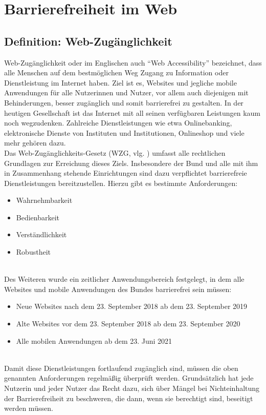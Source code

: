 \section{Barrierefreiheit im Web}
\subsection{Definition: Web-Zugänglichkeit}
Web-Zugänglichkeit oder im Englischen auch ``Web Accessibility'' bezeichnet, dass alle Menschen auf dem bestmöglichen Weg Zugang zu Information oder Dienstleistung im Internet haben. Ziel ist es, Websites und jegliche mobile Anwendungen für alle Nutzerinnen und Nutzer, vor allem auch diejenigen mit Behinderungen, besser zugänglich und somit barrierefrei zu gestalten. In der heutigen Gesellschaft ist das Internet mit all seinen verfügbaren Leistungen kaum noch wegzudenken. Zahlreiche Dienstleistungen wie etwa Onlinebanking, elektronische Dienste von Instituten und Institutionen, Onlineshop und viele mehr gehören dazu.\\
Das Web-Zugänglichkeits-Gesetz (WZG, vlg. \cite{ris_wzg_2020}) umfasst alle rechtlichen Grundlagen zur Erreichung dieses Ziels. Insbesondere der Bund und alle mit ihm in Zusammenhang stehende Einrichtungen sind dazu verpflichtet barrierefreie Dienstleistungen bereitzustellen. Hierzu gibt es bestimmte Anforderungen:

\begin{itemize}
    \item Wahrnehmbarkeit
    \item Bedienbarkeit
    \item Verständlichkeit
    \item Robustheit
\end{itemize}

\mbox{}\\Des Weiteren wurde ein zeitlicher Anwendungsbereich festgelegt, in dem alle Websites und mobile Anwendungen des Bundes barrierefrei sein müssen:

\begin{itemize}
    \item Neue Websites nach dem 23. September 2018 ab dem 23. September 2019
    \item Alte Websites vor dem 23. September 2018 ab dem 23. September 2020
    \item Alle mobilen Anwendungen ab dem 23. Juni 2021
\end{itemize}

\mbox{}\\Damit diese Dienstleistungen fortlaufend zugänglich sind, müssen die oben genannten Anforderungen regelmäßig überprüft werden. Grundsätzlich hat jede Nutzerin und jeder Nutzer das Recht dazu, sich über Mängel bei Nichteinhaltung der Barrierefreiheit zu beschweren, die dann, wenn sie berechtigt sind, beseitigt werden müssen. 

